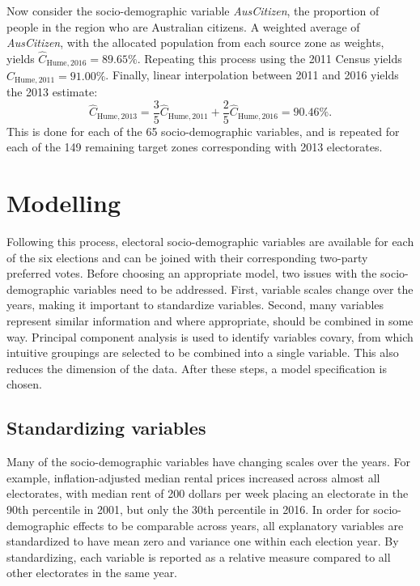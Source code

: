 \documentclass[11pt,a4paper,]{article}
\begin{document}
Now consider the socio-demographic variable \emph{AusCitizen}, the proportion of people in the region who are Australian citizens. A weighted average of \emph{AusCitizen}, with the allocated population from each source zone as weights, yields \(\hat{C}_{\text{Hume},2016} = 89.65\%\). Repeating this process using the 2011 Census yields \(\hat{C}_{\text{Hume},2011} = 91.00\%\). Finally, linear interpolation between 2011 and 2016 yields the 2013 estimate:
\[
  \hat{C}_{\text{Hume},2013}
    = \frac{3}{5} \hat{C}_{\text{Hume},2011} + \frac{2}{5} \hat{C}_{\text{Hume},2016}
    =  90.46\%.
\]
This is done for each of the 65 socio-demographic variables, and is repeated for each of the 149 remaining target zones corresponding with 2013 electorates.

\hypertarget{modelling}{%
\section{Modelling}\label{modelling}}

Following this process, electoral socio-demographic variables are available for each of the six elections and can be joined with their corresponding two-party preferred votes. Before choosing an appropriate model, two issues with the socio-demographic variables need to be addressed. First, variable scales change over the years, making it important to standardize variables. Second, many variables represent similar information and where appropriate, should be combined in some way. Principal component analysis is used to identify variables covary, from which intuitive groupings are selected to be combined into a single variable. This also reduces the dimension of the data. After these steps, a model specification is chosen.

\hypertarget{standardizing-variables}{%
\subsection{Standardizing variables}\label{standardizing-variables}}

Many of the socio-demographic variables have changing scales over the years. For example, inflation-adjusted median rental prices increased across almost all electorates, with median rent of 200 dollars per week placing an electorate in the 90th percentile in 2001, but only the 30th percentile in 2016. In order for socio-demographic effects to be comparable across years, all explanatory variables are standardized to have mean zero and variance one within each election year. By standardizing, each variable is reported as a relative measure compared to all other electorates in the same year.
\end{document}
